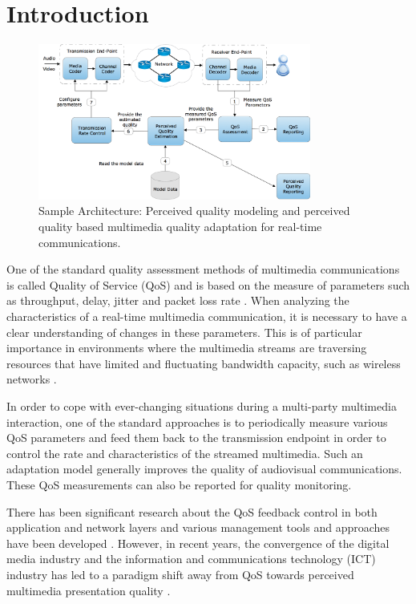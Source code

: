 \documentclass[journal]{IEEEtran}
\begin{document}

\vspace{-0.2cm}
\section{Introduction}
\label{sec:intro}

\begin{figure}[ht!]
  \centering
    \includegraphics[width=0.8\textwidth]{./QoEFeedback.png}
    \caption{Sample Architecture: Perceived quality modeling and perceived quality based multimedia quality adaptation for real-time communications.}
    \label{fig:QoEFeedback}
    \vspace{-0.3cm}
\end{figure}

One of the standard quality assessment methods of multimedia communications is called Quality of Service (QoS) and is based on the measure of parameters such as throughput, delay, jitter and packet loss rate \cite{perkiselectronic}. When analyzing the characteristics of a real-time multimedia communication, it is necessary to have a clear understanding of changes in these parameters. This is of particular importance in environments where the multimedia streams are traversing resources that have limited and fluctuating bandwidth capacity, such as wireless networks \cite{hansen2013assessing}.

In order to cope with ever-changing situations during a multi-party multimedia interaction, one of the standard approaches is to periodically measure various QoS parameters and feed them back to the transmission endpoint in order to control the rate and characteristics of the streamed multimedia. Such an adaptation model generally improves the quality of audiovisual communications. These QoS measurements can also be reported for quality monitoring.

There has been significant research about the QoS feedback control in both application and network layers and various management tools and approaches have been developed \cite{bordetsky2001feedback}. However, in recent years, the convergence of the digital media industry and the information and communications technology (ICT) industry has led to a paradigm shift away from QoS towards perceived multimedia presentation quality \cite{perkiselectronic}.
\end{document}
